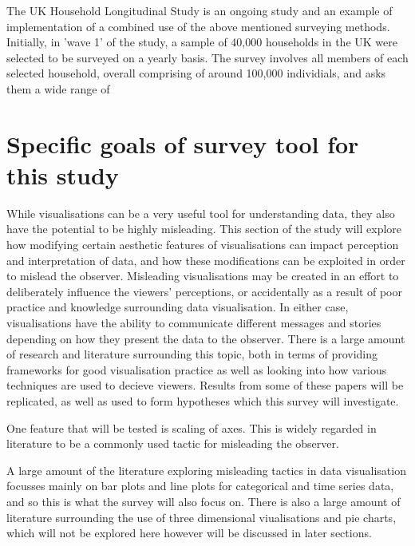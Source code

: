 The UK Household Longitudinal Study is an ongoing study and an example of implementation of a combined use of the above mentioned surveying methods.
Initially, in 'wave 1' of the study, a sample of 40,000 households in the UK were selected to be surveyed on a yearly basis. The survey involves all 
members of each selected household, overall comprising of around 100,000 individials, and asks them a wide range of 





\section{Specific goals of survey tool for this study}
While visualisations can be a very useful tool for understanding data, they also have the potential to be highly misleading. This section of the 
study will explore how modifying certain aesthetic features of visualisations can impact perception and interpretation of data, and how these 
modifications can be exploited in order to mislead the observer. Misleading visualisations may be created in an effort to deliberately influence the 
viewers' perceptions, or accidentally as a result of poor practice and knowledge surrounding data visualisation. In either case, visualisations have the
ability to communicate different messages and stories depending on how they present the data to the observer. There is a large amount of research and 
literature surrounding this topic, both in terms of providing frameworks for good visualisation practice as well as looking into how various techniques 
are used to decieve viewers. Results from some of these papers will be replicated, as well as used to form hypotheses which this survey will investigate.\newline

One feature that will be tested is scaling of axes. This is widely regarded in literature to be a commonly used tactic for misleading the observer.

 





A large amount of the literature exploring misleading tactics in data visualisation focusses mainly on bar plots and line plots for categorical and 
time series data, and so this is what the survey will also focus on. There is also a large amount of literature surrounding the use of three dimensional 
viualisations and pie charts, which will not be explored here however will be discussed in later sections. 


